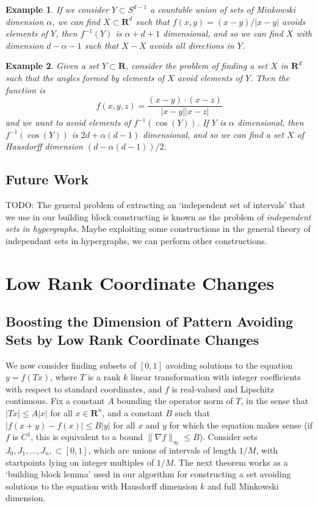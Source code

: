 \documentclass{report}
\theoremstyle{plain}
\newtheorem*{example}{Example}
\theoremstyle{plain}
\begin{document}
\begin{example}
    If we consider $Y \subset S^{d-1}$ a countable union of sets of Minkowski dimension $\alpha$, we can find $X \subset \mathbf{R}^d$ such that $f(x,y) = (x - y)/|x-y|$ avoids elements of $Y$, then $f^{-1}(Y)$ is $\alpha + d + 1$ dimensional, and so we can find $X$ with dimension $d-\alpha-1$ such that $X - X$ avoids all directions in $Y$.
\end{example}

\begin{example}
    Given a set $Y \subset \mathbf{R}$, consider the problem of finding a set $X$ in $\mathbf{R}^d$ such that the angles formed by elements of $X$ avoid elements of $Y$. Then the function is
    \[ f(x,y,z) = \frac{(x - y) \cdot (x - z)}{|x - y| |x - z|} \]
    and we want to avoid elements of $f^{-1}(\cos(Y))$. If $Y$ is $\alpha$ dimensional, then $f^{-1}(\cos(Y))$ is $2d + \alpha(d - 1)$ dimensional, and so we can find a set $X$ of Hausdorff dimension $(d - \alpha(d-1))/2$.
\end{example}

\section{Future Work}

TODO: The general problem of extracting an `independent set of intervals' that we use in our building block constructing is known as the problem of {\it independent sets in hypergraphs}. Maybe exploiting some constructions in the general theory of independant sets in hypergraphs, we can perform other constructions.

\chapter{Low Rank Coordinate Changes}

\section{Boosting the Dimension of Pattern Avoiding Sets by Low Rank Coordinate Changes}

We now consider finding subsets of $[0,1]$ avoiding solutions to the equation $y = f(Tx)$, where $T$ is a rank $k$ linear transformation with integer coefficients with respect to standard coordinates, and $f$ is real-valued and Lipschitz continuous. Fix a constant $A$ bounding the operator norm of $T$, in the sense that $|Tx| \leq A|x|$ for all $x \in \mathbf{R}^n$, and a constant $B$ such that $|f(x+y) - f(x)| \leq B|y|$ for all $x$ and $y$ for which the equation makes sense (if $f$ is $C^1$, this is equivalent to a bound $\| \nabla f \|_\infty \leq B$). Consider sets $J_0, J_1, \dots, J_n, \subset [0,1]$, which are unions of intervals of length $1/M$, with startpoints lying on integer multiples of $1/M$. The next theorem works as a `building block lemma' used in our algorithm for constructing a set avoiding solutions to the equation with Hausdorff dimension $k$ and full Minkowski dimension.
\end{document}
